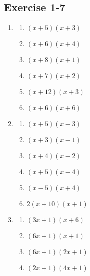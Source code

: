 \subsection{Exercise 1-7} %
\begin{enumerate}[itemsep=5pt, label=\textbf{\arabic*}. ] 
\item %
\begin{multicols}{2}
\begin{enumerate}[itemsep=5pt, label=\textbf{(\alph*)} ] 
\item $(x + 5)(x + 3)$%
\item $(x + 6)(x + 4)$%
\item $(x + 8)(x + 1)$%
\item $(x + 7)(x + 2)$%
\item $(x + 12)(x + 3)$%
\item $(x + 6)(x + 6)$%
\end{enumerate}
\end{multicols}


\item %
\begin{multicols}{2}
\begin{enumerate}[itemsep=5pt, label=\textbf{(\alph*)} ]  
\item $(x + 5)(x - 3)$%
\item $(x + 3)(x - 1)$%
\item $(x + 4)(x - 2)$%
\item $(x + 5)(x - 4)$%
\item $(x - 5)(x + 4)$%
\item $2(x + 10)(x + 1)$%
\end{enumerate}
\end{multicols}


\item %
\begin{multicols}{2}
\begin{enumerate}[itemsep=5pt, label=\textbf{(\alph*)} ] 

\item $(3x + 1)(x + 6)$%
\item $(6x + 1)(x + 1)$%
\item $(6x + 1)(2x + 1)$%
\item $(2x + 1)(4x + 1)$%
\end{enumerate}
\end{multicols}


\end{enumerate}

